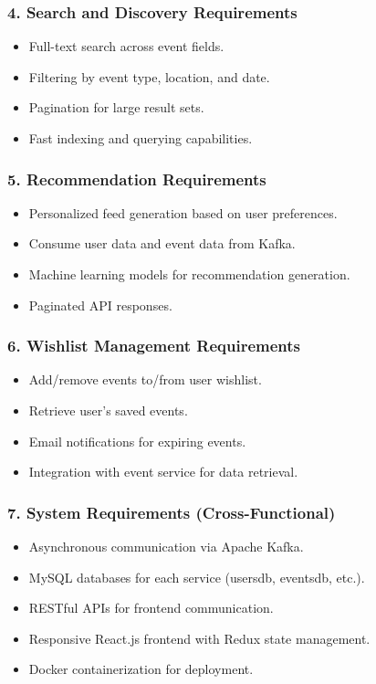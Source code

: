 \documentclass[12pt,a4paper]{report}
\begin{document}
\subsubsection*{4. Search and Discovery Requirements}
\begin{itemize}
    \item Full-text search across event fields.
    \item Filtering by event type, location, and date.
    \item Pagination for large result sets.
    \item Fast indexing and querying capabilities.
\end{itemize}

\subsubsection*{5. Recommendation Requirements}
\begin{itemize}
    \item Personalized feed generation based on user preferences.
    \item Consume user data and event data from Kafka.
    \item Machine learning models for recommendation generation.
    \item Paginated API responses.
\end{itemize}

\subsubsection*{6. Wishlist Management Requirements}
\begin{itemize}
    \item Add/remove events to/from user wishlist.
    \item Retrieve user's saved events.
    \item Email notifications for expiring events.
    \item Integration with event service for data retrieval.
\end{itemize}

\subsubsection*{7. System Requirements (Cross-Functional)}
\begin{itemize}
    \item Asynchronous communication via Apache Kafka.
    \item MySQL databases for each service (usersdb, eventsdb, etc.).
    \item RESTful APIs for frontend communication.
    \item Responsive React.js frontend with Redux state management.
    \item Docker containerization for deployment.
\end{itemize}
\end{document}
